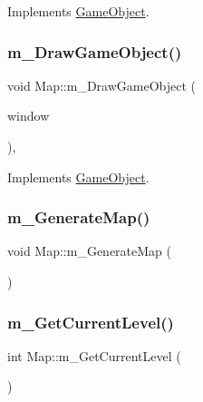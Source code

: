 Implements \mbox{\hyperlink{class_game_object_af1a0662ca445d878b163c4648f90259c}{Game\+Object}}.

\mbox{\label{class_map_aa65945c61f28808b549a264a3b87219e}} 
\subsubsection{\texorpdfstring{m\+\_\+\+Draw\+Game\+Object()}{m\_DrawGameObject()}}
{\footnotesize\ttfamily void Map\+::m\+\_\+\+Draw\+Game\+Object (\begin{DoxyParamCaption}\item[{sf\+::\+Render\+Window \&}]{window }\end{DoxyParamCaption})\hspace{0.3cm}{\ttfamily [override]}, {\ttfamily [virtual]}}



Implements \mbox{\hyperlink{class_game_object_a184ac59fd5167c55a54b50894e5b6721}{Game\+Object}}.

\mbox{\label{class_map_a44b30d85da0d39adb6b144af1ae98616}} 
\subsubsection{\texorpdfstring{m\+\_\+\+Generate\+Map()}{m\_GenerateMap()}}
{\footnotesize\ttfamily void Map\+::m\+\_\+\+Generate\+Map (\begin{DoxyParamCaption}{ }\end{DoxyParamCaption})}

\mbox{\label{class_map_a2dd8826757e273671fc952dcd7c9c6b1}} 
\subsubsection{\texorpdfstring{m\+\_\+\+Get\+Current\+Level()}{m\_GetCurrentLevel()}}
{\footnotesize\ttfamily int Map\+::m\+\_\+\+Get\+Current\+Level (\begin{DoxyParamCaption}{ }\end{DoxyParamCaption})}


